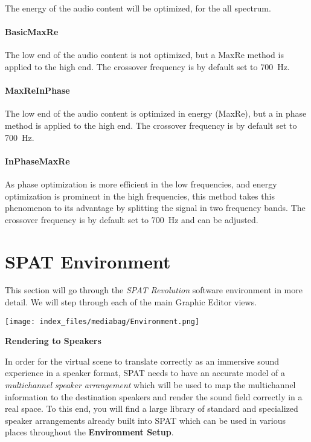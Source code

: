 \documentclass[
  letterpaper,
  DIV=11,
  numbers=noendperiod]{scrreport}
\begin{document}
The energy of the audio content will be optimized, for the all spectrum.

\hypertarget{basicmaxre}{%
\subsection{BasicMaxRe}\label{basicmaxre}}

The low end of the audio content is not optimized, but a MaxRe method is
applied to the high end. The crossover frequency is by default set to
700~Hz.

\hypertarget{maxreinphase}{%
\subsection{MaxReInPhase}\label{maxreinphase}}

The low end of the audio content is optimized in energy (MaxRe), but a
in phase method is applied to the high end. The crossover frequency is
by default set to 700~Hz.

\hypertarget{inphasemaxre}{%
\subsection{InPhaseMaxRe}\label{inphasemaxre}}

As phase optimization is more efficient in the low frequencies, and
energy optimization is prominent in the high frequencies, this method
takes this phenomenon to its advantage by splitting the signal in two
frequency bands. The crossover frequency is by default set to 700~Hz and
can be adjusted.

\part{SPAT Environment}

This section will go through the \emph{SPAT Revolution} software
environment in more detail. We will step through each of the main
Graphic Editor views.

\texttt{[image: index\_files/mediabag/Environment.png]}

\textbf{Rendering to Speakers}

In order for the virtual scene to translate correctly as an immersive
sound experience in a speaker format, SPAT needs to have an accurate
model of a \emph{multichannel speaker arrangement} which will be used to
map the multichannel information to the destination speakers and render
the sound field correctly in a real space. To this end, you will find a
large library of standard and specialized speaker arrangements already
built into SPAT which can be used in various places throughout the
\textbf{Environment Setup}.
\end{document}
